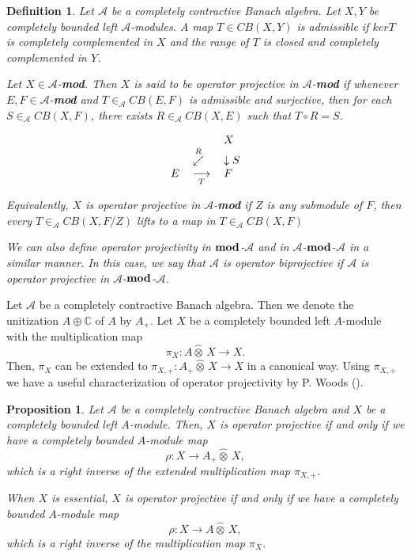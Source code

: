 \documentclass[10pt]{amsart}
\newtheorem{prop}[thm]{Proposition}
\newtheorem{defn}[thm]{Definition}
\numberwithin{thm}{section}
\numberwithin{equation}{section}
\begin{document}
\begin{defn} 
Let $\mathcal{A}$ be a completely contractive Banach algebra. Let $X,Y$ be completely bounded 
left $\mathcal{A}$-modules. A map $T\in CB(X,Y)$ is \textit{admissible} if $ker T$ is completely 
complemented in $X$ and the range of $T$ is closed and completely complemented in $Y$. 

Let $X\in \mathcal{A}$-{\bf mod}. Then $X$ is said to be \textit{operator projective in} 
$\mathcal{A}$-{\bf mod} if whenever $E,F\in \mathcal{A}$-{\bf mod} and 
$T\in _{\mathcal{A}}CB(E,F)$ is admissible and surjective, 
then for each $S\in  _{\mathcal{A}}CB(X,F)$, there exists $R\in  _{\mathcal{A}}CB(X,E)$ such that 
$T\circ R=S$. 

\begin{equation*}
\begin{tabular}{lll}
&  & $X$ \\ 
& $\overset{R}{\swarrow }$ & $\downarrow S$ \\ 
$E$ & $\underset{T}{\longrightarrow }$ & $F$\end{tabular}
\end{equation*}

Equivalently, $X$ is operator projective in $\mathcal{A}$-{\bf mod} if $Z$ is any 
submodule of $F$, then every $T\in _{\mathcal{A}}CB(X,F/Z)$ lifts to 
a map in $T\in _{\mathcal{A}}CB(X,F)$

We can also define operator projectivity in ${\bf mod}$-$\mathcal{A}$ and in $\mathcal{A}$-${\bf mod}$-$\mathcal{A}$ 
in a similar manner. In this case, we say that $\mathcal{A}$ is \textit{operator biprojective} if $\mathcal{A}$ is
operator projective in $\mathcal{A}$-${\bf mod}$-$\mathcal{A}$.
\end{defn} 

Let $\mathcal{A}$ be a completely contractive Banach algebra. Then we denote the unitization $A \oplus \mathbb{C}$ of $A$ by $A_+$.
Let $X$ be a completely bounded left $A$-module with the multiplication map
	$$\pi_X : A {\widehat{\otimes}}\, X\rightarrow X.$$
Then, $\pi_X$ can be extended to $\pi_{X,+} : A_+ {\widehat{\otimes}}\, X \rightarrow X$ in a canonical way.
Using $\pi_{X,+}$ we have a useful characterization of operator projectivity by P. Woods (\cite[Corollary 3.20, Proposition 3.24]{W02}).

	\begin{prop}\label{prop-woods}
	Let $\mathcal{A}$ be a completely contractive Banach algebra and $X$ be a completely bounded left $A$-module.
	Then, $X$ is operator projective if and only if we have a completely bounded $A$-module map
		$$\rho : X \rightarrow A_+ {\widehat{\otimes}}\, X,$$
	which is a right inverse of the extended multiplication map $\pi_{X,+}$.
	
	When $X$ is essential, $X$ is operator projective if and only if we have a completely bounded $A$-module map
		$$\rho : X \rightarrow A {\widehat{\otimes}}\, X,$$
	which is a right inverse of the multiplication map $\pi_X$.
	\end{prop}
\end{document}

